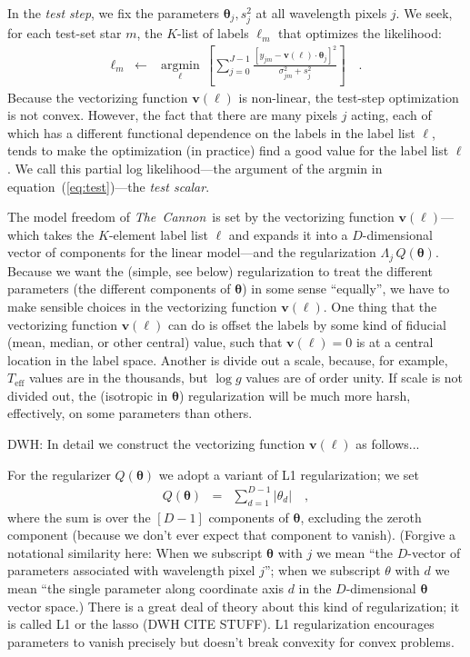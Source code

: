 \documentclass[12pt,preprint]{aastex}
\newcommand{\project}[1]{\textsl{#1}}
\newcommand{\TheCannon}{\project{The~Cannon}}
\newcommand{\logg}{\log g}
\newcommand{\Teff}{T_{\mathrm{eff}}}
\newcommand{\Dvector}[1]{\boldsymbol{#1}}
\newcommand{\vectheta}{\Dvector{\theta}}
\newcommand{\vecv}{\Dvector{v}}
\newcommand{\argmin}[1]{\underset{#1}{\operatorname{argmin}}\,}
\begin{document}
In the \emph{test step}, we fix the parameters $\vectheta_j,s^2_j$ at all
wavelength pixels $j$.
We seek, for each test-set star $m$, the $K$-list of labels $\ell_m$
that optimizes the likelihood:
\begin{eqnarray}\label{eq:test}
  \ell_m &\leftarrow& \argmin{\ell}\left[
    \sum_{j=0}^{J-1} \frac{[y_{jm}-\vecv(\ell)\cdot\vectheta_j]^2}{\sigma^2_{jm}+s^2_j}
    \right]
  \quad .
\end{eqnarray}
Because the vectorizing function $\vecv(\ell)$ is non-linear, the
test-step optimization is not convex.
However, the fact that there are many pixels $j$ acting, each of which
has a different functional dependence on the labels in the label list
$\ell$, tends to make the optimization (in practice) find a good value
for the label list $\ell$.
We call this partial log likelihood---the argument of the
argmin in equation~(\ref{eq:test})---the \emph{test scalar}.

The model freedom of \TheCannon\ is set by the vectorizing function
$\vecv(\ell)$---which takes the $K$-element label list $\ell$ and expands
it into a $D$-dimensional vector of components for the linear
model---and the regularization $\Lambda_j\,Q(\vectheta)$.
Because we want the (simple, see below) regularization to treat the
different parameters (the different components of $\vectheta$) in some
sense ``equally'', we have to make sensible choices in the vectorizing
function $\vecv(\ell)$.
One thing that the vectorizing function $\vecv(\ell)$ can do is offset the
labels by some kind of fiducial (mean, median, or other central)
value, such that $\vecv(\ell)=0$ is at a central location in the label
space.
Another is divide out a scale, because, for example, $\Teff$ values
are in the thousands, but $\logg$ values are of order unity.
If scale is not divided out, the (isotropic in $\vectheta$)
regularization will be much more harsh, effectively, on some
parameters than others.

DWH: In detail we construct the vectorizing function $\vecv(\ell)$ as follows...

For the regularizer $Q(\vectheta)$ we adopt a variant of L1
regularization; we set
\begin{eqnarray}
  Q(\vectheta) &=& \sum_{d=1}^{D-1} |\theta_d|
  \quad,
\end{eqnarray}
where the sum is over the $[D-1]$ components of $\vectheta$, excluding
the zeroth component (because we don't ever expect that component to
vanish).
(Forgive a notational similarity here: When we subscript $\vectheta$ with
$j$ we mean ``the $D$-vector of parameters associated with wavelength
pixel $j$''; when we subscript $\theta$ with $d$ we mean ``the single
parameter along coordinate axis $d$ in the $D$-dimensional $\vectheta$
vector space.)
There is a great deal of theory about this kind of regularization; it
is called L1 or the lasso (DWH CITE STUFF).
L1 regularization encourages parameters to vanish precisely but
doesn't break convexity for convex problems.
\end{document}
